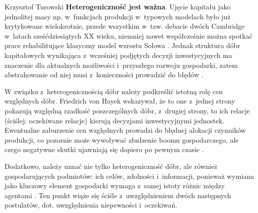 \begin{artplenv}{Krzysztof Turowski}
\textbf{Heterogeniczność jest ważna}. Ujęcie kapitału jako jednolitej masy np. w~funkcjach produkcji w~typowych modelach
było już krytykowane wielokrotnie, przede wszystkim w~tzw. debacie dwóch Cambridge w~latach sześćdziesiątych XX wieku,
niemniej nawet współcześnie można spotkać prace rehabilitujące klasyczny model wzrostu Solowa
\parencite{mankiw_contribution_1992}.
Jednak struktura dóbr kapitałowych wynikająca z~wcześniej podjętych
decyzji inwestycyjnych ma znaczenie dla aktualnych możliwości i~przyszłego rozwoju gospodarki, zatem abstrahowanie od
niej musi z~konieczności prowadzić do błędów
\parencite{skousen_structure_2007}.

W związku z~heterogenicznością dóbr należy podkreślić istotną rolę cen względnych dóbr. Friedrich von Hayek wskazywał,
że to one z~jednej strony pokazują względną rzadkość poszczególnych dóbr, z~drugiej strony, to ich relacje (ściślej:
oczekiwane relacje) kierują decyzjami inwestycyjnymi jednostek. Ewentualne zaburzenie cen względnych prowadzi do
błędnej alokacji czynników produkcji, co pozornie może wywoływać złudzenie boomu gospodarczego, ale czego negatywne
skutki ujawniają się dopiero po pewnym czasie
\parencite{hayek_prices_1931,mises_ludzkie_2007}.

Dodatkowo, należy uznać nie tylko heterogeniczność dóbr, ale również gospodarujących podmiotów: ich celów,
zdolności i~informacji, ponieważ wymiana jako kluczowy element gospodarki wymaga z~samej istoty różnic między agentami
\parencite{colander_financial_2009}.
Ten punkt wiąże się ściśle z~uwzględnieniem dwóch następnych
postulatów, dot. uwzględnienia niepewności i~oczekiwań.


\end{artplenv}
